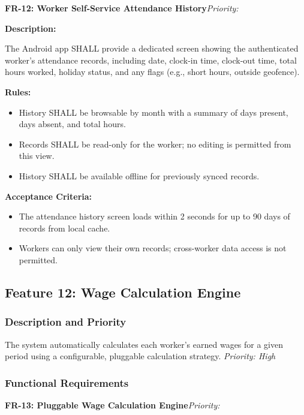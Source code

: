 \documentclass[12pt, a4paper]{article}
\newcommand{\frblock}[2]{%
    \noindent\textbf{#1}\hfill\textit{Priority: #2}%
    \par\smallskip%
}
\newcommand{\srsfield}[1]{\noindent\textbf{#1:}\par}
\begin{document}
\frblock{FR-12: Worker Self-Service Attendance History}{}

\srsfield{Description}
The Android app SHALL provide a dedicated screen showing the authenticated
worker's attendance records, including date, clock-in time, clock-out
time, total hours worked, holiday status, and any flags (e.g., short
hours, outside geofence).

\srsfield{Rules}
\begin{itemize}
    \item History SHALL be browsable by month with a summary of days
          present, days absent, and total hours.
    \item Records SHALL be read-only for the worker; no editing is
          permitted from this view.
    \item History SHALL be available offline for previously synced records.
\end{itemize}

\srsfield{Acceptance Criteria}
\begin{itemize}
    \item The attendance history screen loads within 2 seconds for up to
          90 days of records from local cache.
    \item Workers can only view their own records; cross-worker data
          access is not permitted.
\end{itemize}

\subsection{Feature 12: Wage Calculation Engine}

\subsubsection*{Description and Priority}
The system automatically calculates each worker's earned wages for a
given period using a configurable, pluggable calculation strategy.
\hfill \textit{Priority: High}

\subsubsection*{Functional Requirements}

\frblock{FR-13: Pluggable Wage Calculation Engine}{}
\end{document}
